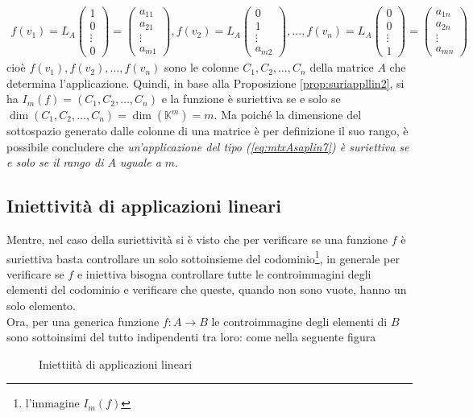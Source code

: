 \documentclass{book}
\theoremstyle{definition}
\theoremstyle{plain}
\begin{document}
\begin{eqnarray*}
  f(v_1)=L_A
  \begin{pmatrix}
    1\\
    0\\
    \vdots\\
    0
  \end{pmatrix}=
  \begin{pmatrix}
    a_{11}\\
    a_{21}\\
    \vdots\\
    a_{m1}
  \end{pmatrix},f(v_2)=L_A
  \begin{pmatrix}
    0\\
    1\\
    \vdots\\
    a_{m2}
  \end{pmatrix},\dots,f(v_n)=L_A
  \begin{pmatrix}
    0\\
    0\\
    \vdots\\
    1
  \end{pmatrix}=
  \begin{pmatrix}
    a_{1n}\\
    a_{2n}\\
    \vdots\\
    a_{mn}
  \end{pmatrix}
\end{eqnarray*}
cioè $f(v_1),f(v_2),\dots,f(v_n)$ sono le colonne $C_1,C_2,\dots,C_n$
della matrice $A$ che determina l'applicazione. Quindi, in base alla
Proposizione \ref{prop:suriappllin2}, si ha $I_m(f)=(C_1,C_2,\dots,C_n)$
e la funzione è suriettiva se e solo se $\dim(C_1,C_2,\dots,C_n)=
\dim(\mathds{K}^m)=m$. Ma poiché la dimensione del sottospazio generato
dalle colonne di una matrice è per definizione il suo rango, è possibile
concludere che \textit{un'applicazione del tipo (\ref{eq:mtxAsaplin7})
  è suriettiva se e solo se il rango di $A$ uguale a $m$}.

\subsection{Iniettività di applicazioni lineari}
\label{sec:iniediappllin}

Mentre, nel caso della suriettività si è visto che per verificare se una
funzione $f$ è suriettiva basta controllare un solo sottoinsieme del
codominio\footnote{l'immagine $I_m(f)$}, in generale per verificare se
$f$ e iniettiva bisogna controllare tutte le controimmagini degli
elementi del codominio e verificare che queste, quando non sono vuote,
hanno un solo elemento.\\
Ora, per una generica funzione $f:A\to B$ le controimmagine degli
elementi di $B$ sono sottoinsimi del tutto indipendenti tra loro: come
nella seguente figura
\begin{figure}[ht!]
  \centering
  \resizebox{8cm}{!}{}
  \caption{Iniettiità di applicazioni lineari}
  \label{fig:iniediappllin}
\end{figure}
\end{document}
